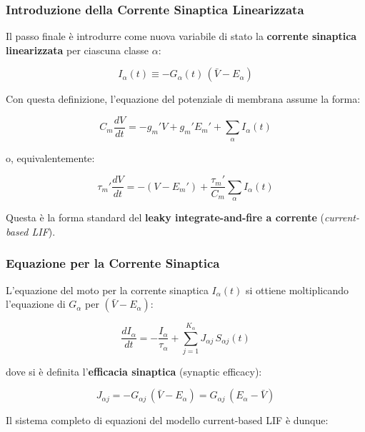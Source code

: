 \subsubsection{Introduzione della Corrente Sinaptica Linearizzata}

Il passo finale è introdurre come nuova variabile di stato la \textbf{corrente sinaptica linearizzata} per ciascuna classe $\alpha$:

\begin{equation}
I_\alpha(t) \equiv -G_\alpha(t)\,(\bar{V} - E_\alpha)
\end{equation}

Con questa definizione, l'equazione del potenziale di membrana assume la forma:

\begin{equation}
C_m \frac{dV}{dt} = -g_m' V + g_m' E_m' + \sum_\alpha I_\alpha(t)
\end{equation}

o, equivalentemente:

\begin{equation}
\tau_m' \frac{dV}{dt} = -(V - E_m') + \frac{\tau_m'}{C_m}\sum_\alpha I_\alpha(t)
\end{equation}

Questa è la forma standard del \textbf{leaky integrate-and-fire a corrente} (\textit{current-based LIF}).

\subsubsection{Equazione per la Corrente Sinaptica}

L'equazione del moto per la corrente sinaptica $I_\alpha(t)$ si ottiene moltiplicando l'equazione di $G_\alpha$ per $(\bar{V} - E_\alpha)$:

\begin{equation}
\frac{d I_\alpha}{dt} = -\frac{I_\alpha}{\tau_\alpha} + \sum_{j=1}^{K_\alpha} J_{\alpha j}\, S_{\alpha j}(t)
\end{equation}

dove si è definita l'\textbf{efficacia sinaptica} (synaptic efficacy):

\begin{equation}
\boxed{J_{\alpha j} = -G_{\alpha j}\,(\bar{V} - E_\alpha) = G_{\alpha j}\,(E_\alpha - \bar{V})}
\end{equation}

Il sistema completo di equazioni del modello current-based LIF è dunque:

